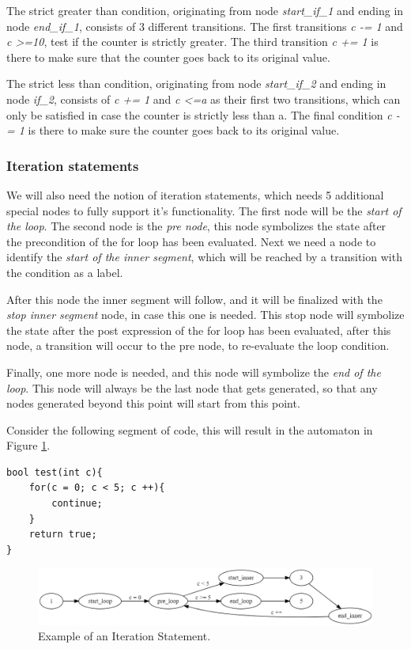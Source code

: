 \documentclass[12pt]{article}
\begin{document}
The strict greater than condition, originating from node \textit{start\_if\_1} and ending in node \textit{end\_if\_1}, consists of 3 different transitions. The first transitions \textit{c -= 1} and \textit{c \textgreater =10}, test if the counter is strictly greater. The third transition \textit{c += 1} is there to make sure that the counter goes back to its original value.

The strict less than condition, originating from node \textit{start\_if\_2} and ending in node \textit{if\_2}, consists of \textit{c += 1} and \textit{c \textless =a} as their first two transitions, which can only be satisfied in case the counter is strictly less than a. The final condition \textit{c -= 1} is there to make sure the counter goes back to its original value.

\subsubsection{Iteration statements}
We will also need the notion of iteration statements, which needs 5 additional special nodes to fully support it's functionality. The first node will be the \textit{start of the loop}. The second node is the \textit{pre node}, this node symbolizes the state after the precondition of the for loop has been evaluated. Next we need a node to identify the \textit{start of the inner segment}, which will be reached by a transition with the condition as a label. 

After this node the inner segment will follow, and it will be finalized with the \textit{stop inner segment} node, in case this one is needed. This stop node will symbolize the state after the post expression of the for loop has been evaluated, after this node, a transition will occur to the pre node, to re-evaluate the loop condition.

Finally, one more node is needed, and this node will symbolize the \textit{end of the loop}. This node will always be the last node that gets generated, so that any nodes generated beyond this point will start from this point.

Consider the following segment of code, this will result in the automaton in Figure \ref{fig:test_counter_automaton}.
\begin{lstlisting}[style=CStyle]
bool test(int c){
	for(c = 0; c < 5; c ++){
		continue;
	}
	return true;
}
\end{lstlisting}

\begin{figure}[h]
	\centering
	\includegraphics[width=0.95\linewidth]{test_counter_automaton}
	\caption{Example of an Iteration Statement.}
	\label{fig:test_counter_automaton}
\end{figure}
\end{document}
